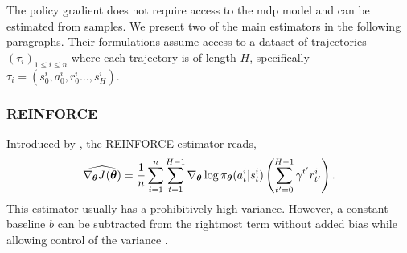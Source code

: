 The policy gradient does not require access to the \gls{mdp} model and can be estimated from samples. 
We present two of the main estimators in the following paragraphs. 
Their formulations assume access to a dataset of trajectories $(\tau_i)_{1\le i\le n}$ where each trajectory is of length $H$, specifically $\tau_i=(s_0^i,a_0^i,r_0^i\dots,s_{H}^i)$.

\subsubsection{REINFORCE} 
Introduced by \cite{williams1992simple}, the REINFORCE estimator reads,
\begin{align*}
    \widehat{\nabla_{\vectorialform{\theta}} \expectedreturn[][](\vectorialform{\theta})} = \frac{1}{n}\sum_{i=1}^{n}\sum_{t=1}^{H-1} \nabla_{\vectorialform{\theta}} \log \pi_{\vectorialform{\theta}}(a_t^i\vert s_t^i)\left(\sum_{t'=0}^{H-1}\gamma^{t'} r_{t'}^i\right).
\end{align*}
This estimator usually has a prohibitively high variance.
However, a constant baseline $b$ can be subtracted from the rightmost term without added bias while allowing control of the variance 
\cite{williams1992simple}.

